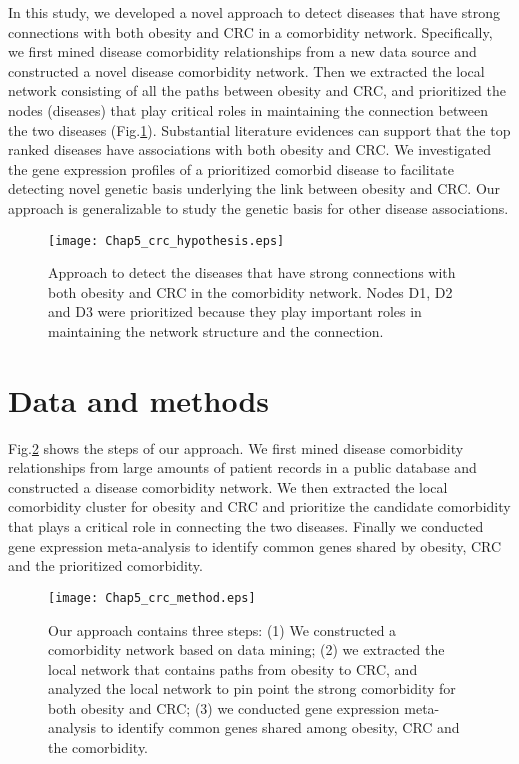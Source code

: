 In this study, we developed a novel approach to detect diseases
that have strong connections with both obesity and CRC in a comorbidity network.
Specifically, we first mined disease comorbidity relationships from a new data source and constructed
a novel disease comorbidity network. Then we extracted the local network consisting of all the
paths between obesity and CRC, and prioritized the nodes (diseases) that play critical roles
in maintaining the connection between the two diseases (Fig.\ref{crchypothesis}). Substantial literature evidences can support that the top ranked diseases have associations with both obesity and CRC. We investigated the gene expression profiles of a prioritized comorbid disease to facilitate detecting novel genetic basis underlying the link between obesity and CRC. Our approach is generalizable to study the genetic basis for other disease associations.
\begin{figure}[!tpb]
\vspace{-.1cm}
\centerline{\texttt{[image: Chap5\_crc\_hypothesis.eps]}}
\caption{Approach to detect the diseases that have strong connections with both obesity and CRC in the comorbidity network. Nodes D1, D2 and D3 were prioritized because they play important roles in maintaining the network structure and the connection. }
\vspace{-0cm}
\label{crchypothesis}
\end{figure}

\section{Data and methods}
Fig.\ref{crcmethod} shows the steps of our approach.
We first mined disease comorbidity relationships from large amounts of patient records
in a public database and constructed a disease comorbidity network.
We then extracted the local comorbidity cluster for obesity and CRC
and prioritize the candidate comorbidity that plays a critical role in connecting the two diseases.
Finally we conducted gene expression meta-analysis to
identify common genes shared by obesity, CRC and the prioritized comorbidity.
\begin{figure}[!tpb]
\vspace{-.1cm}
\centerline{\texttt{[image: Chap5\_crc\_method.eps]}}
\caption{Our approach contains three steps: (1) We constructed a comorbidity network based on data mining; (2) we extracted the local network that contains paths from obesity to CRC, and analyzed the local network to pin point the strong comorbidity for both obesity and CRC; (3) we conducted gene expression meta-analysis to identify common genes shared among obesity, CRC and the comorbidity. }
\vspace{-0cm}
\label{crcmethod}
\end{figure}

